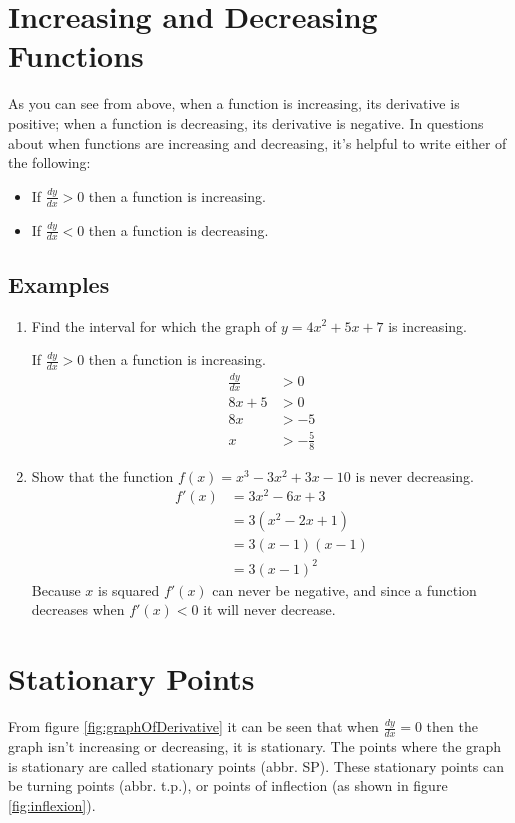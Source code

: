 \section{Increasing and Decreasing Functions}
As you can see from above, when a function is increasing, its derivative is positive; when a function is decreasing, its derivative is negative. In questions about when functions are increasing and decreasing, it's helpful to write either of the following:

\begin{itemize}
	\item If $\frac{dy}{dx}>0$ then a function is increasing.
	\item If $\frac{dy}{dx}<0$ then a function is decreasing.
\end{itemize}

\subsection{Examples}
\begin{enumerate}
	\item
	Find the interval for which the graph of $y=4x^2+5x+7$ is increasing.
	
	If $\frac{dy}{dx}>0$ then a function is increasing.
	\begin{align*}
		\frac{dy}{dx} &> 0\\
		8x+5&>0\\
		8x&>-5\\
		x&>-\frac{5}{8}
	\end{align*}
	
	\item
	Show that the function $f(x) = x^3-3x^2+3x-10$ is never decreasing.
	\begin{align*}
		f'(x) &= 3x^2-6x+3\\
		&= 3(x^2-2x+1)\\
		&= 3(x-1)(x-1)\\
		&= 3(x-1)^2
	\end{align*}
	Because $x$ is squared $f'(x)$ can never be negative, and since a function decreases when $f'(x) < 0$ it will never decrease.
\end{enumerate}


\section{Stationary Points}
From figure \ref{fig:graphOfDerivative} it can be seen that when $\frac{dy}{dx} = 0$ then the graph isn't increasing or decreasing, it is stationary. The points where the graph is stationary are called stationary points (abbr. SP). These stationary points can be turning points (abbr. t.p.), or points of inflection (as shown in figure \ref{fig:inflexion}).

